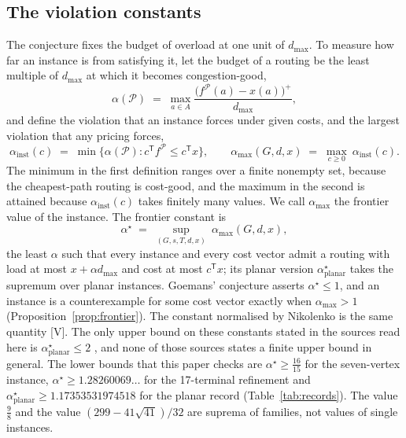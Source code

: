 \documentclass[11pt]{article}
\theoremstyle{remark}
\newcommand{\dmax}{d_{\max}}
\newcommand{\flow}{f}
\begin{document}
\subsection{The violation constants}
\label{sec:constants}

The conjecture fixes the budget of overload at one unit of $\dmax$. To measure how far an instance is from satisfying it,
let the budget of a routing be the least multiple of $\dmax$ at which it becomes congestion-good,
\begin{equation}
\alpha(\mathcal P)\;=\;\max_{a\in A}\frac{\bigl(\flow^{\mathcal P}(a)-x(a)\bigr)^{+}}{\dmax},
\label{eq:alpha}
\end{equation}
and define the violation that an instance forces under given costs, and the largest violation that any pricing forces,
\begin{equation}
\alpha_{\mathrm{inst}}(c)\;=\;\min\bigl\{\alpha(\mathcal P)\colon c^{\mathsf T}\flow^{\mathcal P}\le c^{\mathsf T}x\bigr\},
\qquad
\alpha_{\max}(G,d,x)\;=\;\max_{c\ge0}\ \alpha_{\mathrm{inst}}(c).
\label{eq:frontier}
\end{equation}
The minimum in the first definition ranges over a finite nonempty set, because the cheapest-path routing is cost-good, and
the maximum in the second is attained because $\alpha_{\mathrm{inst}}(c)$ takes finitely many values. We call
$\alpha_{\max}$ the frontier value of the instance. The frontier constant is
\begin{equation}
\alpha^\star\;=\;\sup_{(G,s,T,d,x)}\ \alpha_{\max}(G,d,x),
\label{eq:alphastar}
\end{equation}
the least $\alpha$ such that every instance and every cost vector admit a routing with load at most $x+\alpha\dmax$ and cost at
most $c^{\mathsf T}x$; its planar version $\alpha^\star_{\mathrm{planar}}$ takes the supremum over planar instances. Goemans'
conjecture asserts $\alpha^\star\le1$, and an instance is a counterexample for some cost vector exactly when
$\alpha_{\max}>1$ (Proposition~\ref{prop:frontier}). The constant normalised by Nikolenko is the same quantity
\cite{Nik1,Nik2,Nik3} [V]. The only upper bound on these constants stated in the sources read here is $\alpha^\star_{\mathrm{planar}}\le2$ \cite{TVZ24}, and none of those
sources states a finite upper bound in general. The lower bounds that this paper checks are $\alpha^\star\ge\tfrac{16}{15}$ for the seven-vertex
instance, $\alpha^\star\ge1.28260069\ldots$ for the 17-terminal refinement and $\alpha^\star_{\mathrm{planar}}\ge
1.17353531974518$ for the planar record (Table~\ref{tab:records}). The value $\tfrac98$ and the value $(299-41\sqrt{41})/32$
are suprema of families, not values of single instances.
\end{document}
